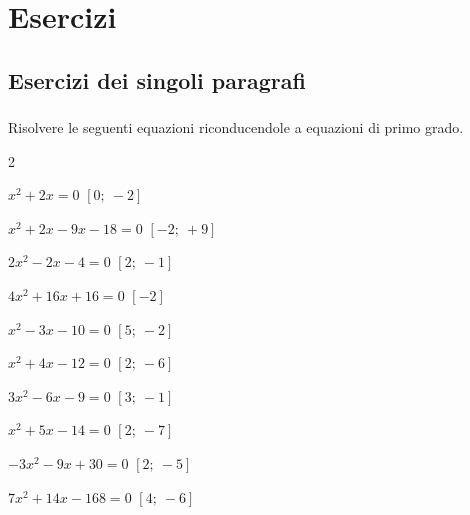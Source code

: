 
\section{Esercizi}

\subsection{Esercizi dei singoli paragrafi}

\subsubsection*{}

\begin{esercizio}[*]
\label{ese:20.1}
Risolvere le seguenti equazioni riconducendole a equazioni di primo grado.
\begin{htmulticols}{2}
\begin{enumeratea}
 \item \(x^{2}+2x=0\) \hfill \(\left[0;~-2\right]\)
 \item \(x^{2}+2x-9x-18=0\) \hfill \(\left[-2;~+9\right]\)
 \item \(2x^{2}-2x-4=0\) \hfill \(\left[2;~-1\right]\)
 \item \(4x^{2}+16x+16=0\) \hfill \(\left[-2\right]\)
 \item \(x^{2}-3x-10=0\) \hfill \(\left[5;~-2\right]\)
 \item \(x^{2}+4x-12=0\) \hfill \(\left[2;~-6\right]\)
 \item \(3x^{2}-6x-9=0\) \hfill \(\left[3;~-1\right]\)
 \item \(x^{2}+5x-14=0\) \hfill \(\left[2;~-7\right]\)
 \item \(-3x^{2}-9x+30=0\) \hfill \(\left[2;~-5\right]\)
 \item \(7x^{2}+14x-168=0\) \hfill \(\left[4;~-6\right]\)
\end{enumeratea}
\end{htmulticols}
\end{esercizio}

